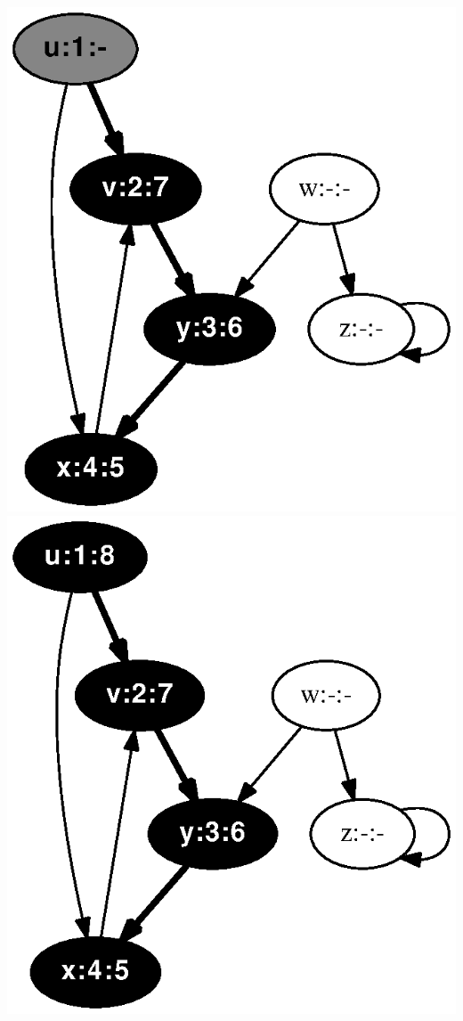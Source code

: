 \documentclass{article}
\begin{document}
\includegraphics[height=.3\textheight]{clrs_example_dfs_07.eps}
\vspace{1em}
\includegraphics[height=.3\textheight]{clrs_example_dfs_08.eps}
\end{document}
